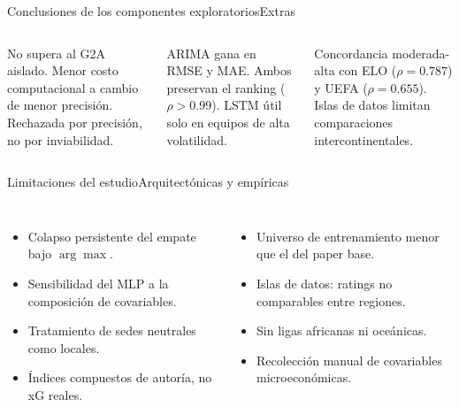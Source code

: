 \documentclass[aspectratio=169,11pt]{beamer}
\begin{document}
\begin{frame}{Conclusiones de los componentes exploratorios}{Extras}
	\begin{columns}[T,onlytextwidth]
		\par\vskip 2mm
		\scriptsize
		No supera al G2A aislado. Menor costo computacional a cambio de menor precisi\'on. Rechazada por precisi\'on, no por inviabilidad.
		\par\vskip 2mm
		\scriptsize
		ARIMA gana en RMSE y MAE. Ambos preservan el ranking ($\rho > 0{.}99$). LSTM \'util solo en equipos de alta volatilidad.
		\par\vskip 2mm
		\scriptsize
		Concordancia moderada-alta con ELO ($\rho = 0{.}787$) y UEFA ($\rho = 0{.}655$). Islas de datos limitan comparaciones intercontinentales.
	\end{columns}
\end{frame}

\begin{frame}{Limitaciones del estudio}{Arquitect\'onicas y emp\'iricas}
	\vspace*{-0.55cm}
	\begin{columns}[T,onlytextwidth]
		\par\vskip 2mm
		\footnotesize
		\begin{itemize}
			\item Colapso persistente del empate bajo $\arg\max$.
			\item Sensibilidad del MLP a la composici\'on de covariables.
			\item Tratamiento de sedes neutrales como locales.
			\item \'Indices compuestos de autor\'ia, no xG reales.
		\end{itemize}
		\par\vskip 2mm
		\footnotesize
		\begin{itemize}
			\item Universo de entrenamiento menor que el del paper base.
			\item Islas de datos: ratings no comparables entre regiones.
			\item Sin ligas africanas ni oce\'anicas.
			\item Recolecci\'on manual de covariables microecon\'omicas.
		\end{itemize}
	\end{columns}
\end{frame}
\end{document}
